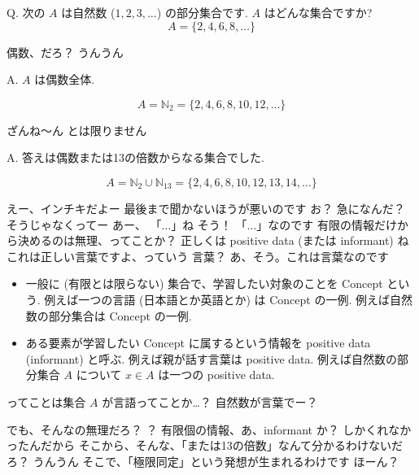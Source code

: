 \begin{boxnote}
Q. 次の $A$ は自然数 ($1, 2, 3, \ldots$) の部分集合です.  $A$ はどんな集合ですか?
$$A = \{2, 4, 6, 8, \ldots\}$$
\end{boxnote}

\YUI 偶数、だろ？
\YUKARI うんうん

\begin{boxnote}
    A. $A$ は偶数全体.

    $$A = \mathbb{N}_{2} = \{2, 4, 6, 8, 10, 12, \ldots\}$$
\end{boxnote}

\YUZUKO ざんね〜ん
\YUZUKO とは限りません

\begin{boxnote}
    A. 答えは偶数または13の倍数からなる集合でした.

    $$A = \mathbb{N}_{2} \cup \mathbb{N}_{13} = \{2, 4, 6, 8, 10, 12, 13, 14, \ldots\}$$
\end{boxnote}

\YUKARI えー、インチキだよー
\YUZUKO 最後まで聞かないほうが悪いのです
\YUI お？ 急になんだ？
\YUZUKO そうじゃなくってー
\YUKARI あー、 「$\dots$」ね
\YUZUKO そう！ 「$\dots$」なのです
\YUI 有限の情報だけから決めるのは無理、ってことか？
\YUZUKO 正しくは positive data (または informant) ね
\YUZUKO これは正しい言葉ですよ、っていう
\YUKARI 言葉？
\YUZUKO あ、そう。これは言葉なのです

\begin{boxnote}
    \begin{itemize}
        \item
            一般に (有限とは限らない) 集合で、学習したい対象のことを Concept という.
            例えば一つの言語 (日本語とか英語とか) は Concept の一例.
            例えば自然数の部分集合は Concept の一例.
        \item
            ある要素が学習したい Concept に属するという情報を positive data (informant) と呼ぶ.
            例えば親が話す言葉は positive data.
            例えば自然数の部分集合 $A$ について $x \in A$ は一つの positive data.
    \end{itemize}
\end{boxnote}

\YUI ってことは集合 $A$ が言語ってことか…？
\YUKARI 自然数が言葉でー？

\PAUSE

\YUI でも、そんなの無理だろ？
\YUZUKO ？
\YUI 有限個の情報、あ、informant か？ しかくれなかったんだから
\YUI そこから、そんな、「または13の倍数」なんて分かるわけないだろ？
\YUKARI うんうん
\YUZUKO そこで、「極限同定」という発想が生まれるわけです
\YUI ほーん？

